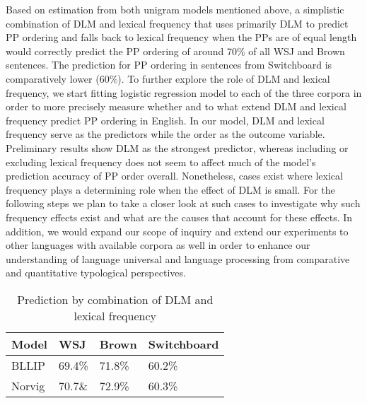 \documentclass[11pt,letterpaper]{article}
\begin{document}
 Based on estimation from both unigram models mentioned above, a simplistic combination of DLM and lexical frequency that uses primarily DLM to predict PP ordering and falls back to lexical frequency when the PPs are of equal length would correctly predict the PP ordering of around 70\% of all WSJ and Brown sentences. The prediction for PP ordering in sentences from Switchboard is comparatively lower (60\%). To further explore the role of DLM and lexical frequency, we start fitting logistic regression model to each of the three corpora in order to more precisely measure whether and to what extend DLM and lexical frequency predict PP ordering in English. In our model, DLM and lexical frequency serve as the predictors while the order as the outcome variable. Preliminary results show DLM as the strongest predictor, whereas including or excluding lexical frequency does not seem to affect much of the model{'}s prediction accuracy of PP order overall. Nonetheless, cases exist where lexical frequency plays a determining role when the effect of DLM is small. For the following steps we plan to take a closer look at such cases to investigate why such frequency effects exist and what are the causes that account for these effects. In addition, we would expand our scope of inquiry and extend our experiments to other languages with available corpora as well in order to enhance our understanding of language universal and language processing from  comparative and quantitative typological perspectives.
 
\begin{table}[h!]
\small
\centering
				\begin{tabular}{|p{1cm}|p{1cm}|p{2cm}|p{2cm}|}
		\hline
	Model &	WSJ & Brown & Switchboard \\ \hline
	BLLIP & 69.4\% & 71.8\% & 60.2\% \\
	Norvig & 70.7\& & 72.9\% & 60.3\% \\ 
	\hline
				\end{tabular}	
		\caption{Prediction by combination of DLM and lexical frequency}
		\end{table}




\end{document}
